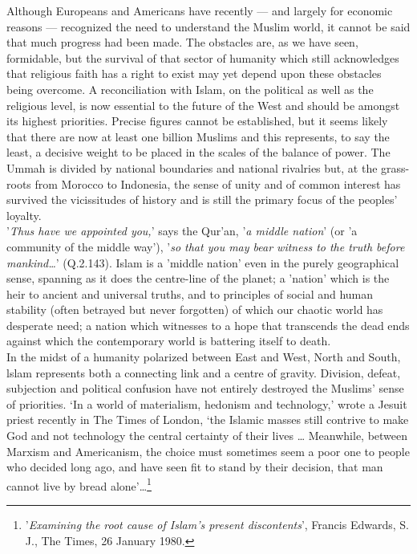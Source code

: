 \documentclass[10pt, twoside]{book}
\begin{document}
Although Europeans and Americans have recently --- and largely for economic reasons --- recognized the need to understand the Muslim world, it cannot be said that much progress had been made. The obstacles are, as we have seen, formidable, but the survival of that sector of humanity which still acknowledges that religious faith has a right to exist may yet depend upon these obstacles being overcome. A reconciliation with Islam, on the political as well as the religious level, is now essential to the future of the West and should be amongst its highest priorities. Precise figures cannot be established, but it seems likely that there are now at least one billion Muslims and this represents, to say the least, a decisive weight to be placed in the scales of the balance of power. The Ummah is divided by national boundaries and national rivalries but, at the grass\hyp{}roots from Morocco to Indonesia, the sense of unity and of common interest has survived the vicissitudes of history and is still the primary focus of the peoples' loyalty. \\

'\emph{Thus have we appointed you,}' says the Qur'an, '\emph{a middle nation}' (or 'a community of the middle way'), '\emph{so that you may bear witness to the truth before mankind\ldots}' (Q.2.143). Islam is a 'middle nation' even in the purely geographical sense, spanning as it does the centre\hyp{}line of the planet; a 'nation' which is the heir to ancient and universal truths, and to principles of social and human stability (often betrayed but never forgotten) of which our chaotic world has desperate need; a nation which witnesses to a hope that transcends the dead ends against which the contemporary world is battering itself to death. \\

In the midst of a humanity polarized between East and West, North and South, lslam represents both a connecting link and a centre of gravity. Division, defeat, subjection and political confusion have not entirely destroyed the Muslims' sense of priorities. `In a world of materialism, hedonism and technology,' wrote a Jesuit priest recently in The Times of London, `the Islamic masses still contrive to make God and not technology the central certainty of their lives \ldots{} Meanwhile, between Marxism and Americanism, the choice must sometimes seem a poor one to people who decided long ago, and have seen fit to stand by their decision, that man cannot live by bread alone'\ldots{}\footnote{'\emph{Examining the root cause of Islam's present discontents}', Francis Edwards, S. J., The Times, 26 January 1980.}\\
\end{document}
